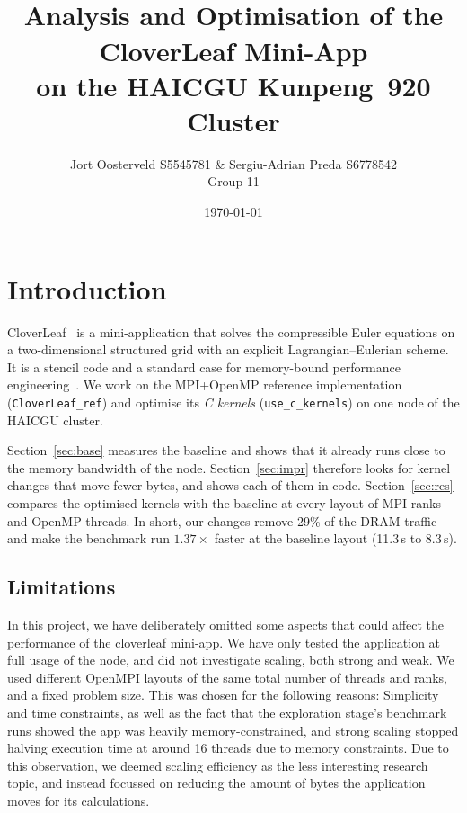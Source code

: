 \documentclass[a4paper,11pt]{article}
\title{\Large{\sc{Performance Engineering}}\\[2mm]
  Analysis and Optimisation of the CloverLeaf Mini-App\\
  on the HAICGU Kunpeng~920 Cluster}
\author{Jort Oosterveld S5545781 \& Sergiu-Adrian Preda S6778542 \\ Group 11}
\date{\today}
\begin{document}
\setlength\parindent{0pt}
\setlength{\parskip}{0.6em}
\maketitle

\section{Introduction}
\begin{sloppypar}
CloverLeaf~\cite{mallinson2013} is a mini-application that solves the compressible Euler equations on a two-dimensional structured grid
with an explicit Lagrangian--Eulerian scheme. It is a stencil code and a standard case for memory-bound
performance engineering~\cite{laukemann2023}. We work on the MPI+OpenMP reference implementation
(\texttt{CloverLeaf\_ref}) and optimise its \emph{C kernels} (\texttt{use\_c\_kernels}) on one node of the
HAICGU cluster.

Section~\ref{sec:base} measures the baseline and shows that it already runs close to the memory bandwidth of
the node. Section~\ref{sec:impr} therefore looks for kernel changes that move fewer bytes, and shows each of
them in code. Section~\ref{sec:res} compares the optimised kernels with the baseline at every layout of MPI
ranks and OpenMP threads. In short, our changes remove 29\% of the DRAM traffic and make the benchmark run
$1.37\times$ faster at the baseline layout (11.3\,s to 8.3\,s).
\end{sloppypar}

\subsection{Limitations}
In this project, we have deliberately omitted some aspects that could affect the performance of the cloverleaf mini-app. We have only tested the application at full usage of the node, and did not investigate scaling, both strong and weak. We used different OpenMPI layouts of the same total number of threads and ranks, and a fixed problem size. This was chosen for the following reasons: Simplicity and time constraints, as well as the fact that the exploration stage's benchmark runs showed the app was heavily memory-constrained, and strong scaling stopped halving execution time at around 16 threads due to memory constraints. Due to this observation, we deemed scaling efficiency as the less interesting research topic, and instead focussed on reducing the amount of bytes the application moves for its calculations.
\end{document}
